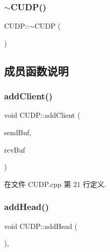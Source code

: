 \mbox{\label{class_c_u_d_p_aa5e4b24a48885c739893d60ffb10672f}} 
\subsubsection{\texorpdfstring{$\sim$\+C\+U\+D\+P()}{~CUDP()}\hspace{0.1cm}{\footnotesize\ttfamily [2/2]}}
{\footnotesize\ttfamily C\+U\+D\+P\+::$\sim$\+C\+U\+DP (\begin{DoxyParamCaption}{ }\end{DoxyParamCaption})}



\subsection{成员函数说明}
\mbox{\label{class_c_u_d_p_a32181d9f38654f9480193af29fc221eb}} 
\subsubsection{\texorpdfstring{add\+Client()}{addClient()}}
{\footnotesize\ttfamily void C\+U\+D\+P\+::add\+Client (\begin{DoxyParamCaption}\item[{\hyperlink{class_msg_list}{Msg\+List}}]{send\+Buf,  }\item[{\hyperlink{class_msg_list}{Msg\+List}}]{rcv\+Buf }\end{DoxyParamCaption})}



在文件 C\+U\+D\+P.\+cpp 第 21 行定义.

\mbox{\label{class_c_u_d_p_a445c3b7fe1b58e8b278115649ad25c3f}} 
\subsubsection{\texorpdfstring{add\+Head()}{addHead()}\hspace{0.1cm}{\footnotesize\ttfamily [1/2]}}
{\footnotesize\ttfamily void C\+U\+D\+P\+::add\+Head (\begin{DoxyParamCaption}{ }\end{DoxyParamCaption})\hspace{0.3cm}{\ttfamily [protected]}, {\ttfamily [virtual]}}



